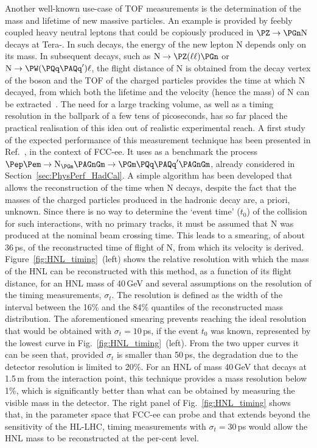 Another well-known use-case of TOF measurements is the determination of the mass and lifetime of new massive particles. 
An example is provided by feebly coupled heavy neutral leptons that could be copiously produced in $\PZ \to \PGn \mathrm{N}$ decays at Tera-\PZ. 
In such decays, the energy of the new lepton $\mathrm{N}$ depends only on its mass. 
In subsequent decays, such as $\mathrm{N} \to \PZ (\ell \ell) \PGn$ or $\mathrm{N} \to \PW(\PQq\PAQq^\prime) \ell$, 
the flight distance of $\mathrm{N}$ is obtained from the decay vertex of the \PZ boson 
and the TOF of the charged particles provides the time at which $\mathrm{N}$ decayed, 
from which both the lifetime and the velocity (hence the mass) of $\mathrm{N}$ can be extracted~\cite{Blondel:2022qqo}.
The need for a large tracking volume, as well as a timing resolution in the ballpark of a few tens of picoseconds, 
has so far placed the practical realisation of this idea out of realistic experimental reach.
A first study of the expected performance of this measurement technique has been presented in Ref.~\cite{Aleksan:2024hyq}, in the context of FCC-ee. 
It uses as a benchmark the process $\epem \to \mathrm{N}_{\PGm} \PAGnGm \to \PGm \PQq\PAQq^\prime \PAGnGm$, 
already considered in Section~\ref{sec:PhysPerf_HadCal}.
A simple algorithm has been developed that allows the reconstruction of the time when $\mathrm{N}$ decays, 
despite the fact that the masses of the charged particles produced in the hadronic \PW decay are, a priori, unknown. 
Since there is no way to determine the `event time' ($t_0$) of the collision for such interactions, with no primary tracks, 
it must be assumed that $\mathrm{N}$ was produced at the nominal beam crossing time. 
This leads to a smearing, of about 36\,ps, of the reconstructed time of flight of $\mathrm{N}$, from which its velocity is derived. 
Figure~\ref{fig:HNL_timing}~(left) shows the relative resolution with which the mass of the HNL can be reconstructed with this method, 
as a function of its flight distance, for an HNL mass of 40\,GeV and several assumptions on the resolution of the timing measurements, $\sigma_t$.
The resolution is defined as the width of the interval between the 16\% and the 84\% quantiles of the reconstructed mass distribution. 
The aforementioned smearing prevents reaching the ideal resolution that would be obtained with $\sigma_t = 10$\,ps, if the event $t_0$ was known, 
represented by the lowest curve in Fig.~\ref{fig:HNL_timing}~(left). 
From the two upper curves it can be seen that, provided $\sigma_t$ is smaller than 50\,ps, the degradation due to the detector resolution is limited to 20\%.
For an HNL of mass 40\,GeV that decays at 1.5\,m from the interaction point, this technique provides a mass resolution below 1\%, 
which is significantly better than what can be obtained by measuring the visible mass in the detector. 
The right panel of Fig.~\ref{fig:HNL_timing} shows that, in the parameter space that FCC-ee can probe and that extends beyond the sensitivity of the HL-LHC, 
timing measurements with $\sigma_t = 30$\,ps would allow the HNL mass to be reconstructed at the per-cent level.

